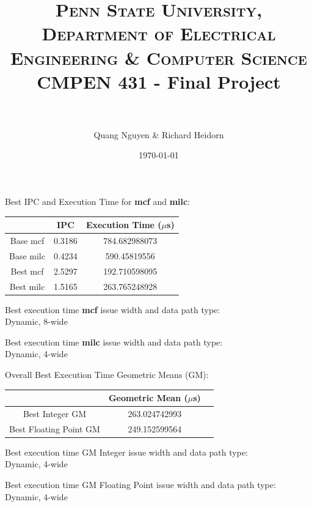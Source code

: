 \documentclass[paper=a4, fontsize=12pt]{scrartcl} %
\title{	
\normalfont \small 
\textsc{Penn State University, Department of Electrical Engineering \& Computer Science}
\horrule{0.5pt} \\[0.4cm] %
	\huge CMPEN 431 - Final Project \\ %
\horrule{2pt} \\[0.5cm] %
}
\author{Quang Nguyen \& Richard Heidorn}
\date{\normalsize \today}
\numberwithin{equation}{section} %
\numberwithin{figure}{section} %
\numberwithin{table}{section} %
\begin{document}
\maketitle %


Best IPC and Execution Time for \textbf{mcf} and \textbf{milc}:

\begin{center}
\begin{tabular}{ |c|c|c| } 
	\hline
	 & IPC & Execution Time ($\mu$s) \\ \hline
	Base mcf & 0.3186 & 784.682988073 \\ \hline
	Base milc & 0.4234 & 590.45819556 \\ \hline
	Best mcf & 2.5297 & 192.710598095 \\ \hline
	Best milc & 1.5165 & 263.765248928 \\ \hline
\end{tabular}
\end{center}

Best execution time \textbf{mcf} issue width and data path type: \\
Dynamic, 8-wide

Best execution time \textbf{milc} issue width and data path type: \\
Dynamic, 4-wide

Overall Best Execution Time Geometric Means (GM):

\begin{center}
\begin{tabular}{ |c|c|c| } 
	\hline
	 & Geometric Mean ($\mu$s) \\ \hline
	Best Integer GM & 263.024742993 \\ \hline
	Best Floating Point GM & 249.152599564 \\ \hline
\end{tabular}
\end{center}

Best execution time GM Integer issue width and data path type: \\
Dynamic, 4-wide

Best execution time GM Floating Point issue width and data path type: \\
Dynamic, 4-wide


\newpage
\end{document}
